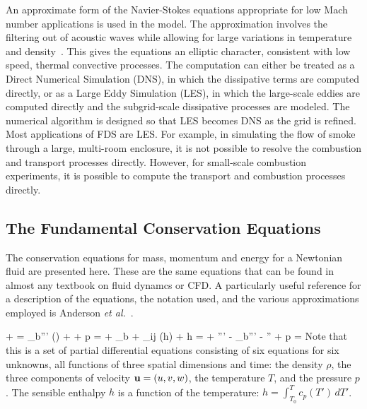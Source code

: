 \documentclass[11pt]{book}
\begin{document}
An approximate form of the Navier-Stokes equations appropriate for
low Mach number applications is used in the model.
The approximation involves the filtering out of acoustic waves while
allowing for large variations in temperature and density~\cite{Rehm:1}.
This gives the equations an elliptic character, consistent with low speed,
thermal convective processes. The computation can either be treated as a
Direct Numerical Simulation (DNS), in which the dissipative terms are computed directly,
or as a Large Eddy Simulation (LES), in which the large-scale eddies are computed
directly and the subgrid-scale dissipative processes are modeled. The numerical algorithm is
designed so that LES becomes DNS as the grid is refined.
Most applications of FDS are LES. For example, in simulating the flow of smoke through a large, multi-room enclosure, it
is not possible to resolve the combustion and transport processes directly.
However, for small-scale combustion experiments,
it is possible to compute the transport and combustion processes directly.

\subsection{The Fundamental Conservation Equations}

\label{basicequations}

The conservation equations for mass, momentum and energy for a
Newtonian fluid are presented here. These are the same equations that can
be found in almost any textbook on fluid dynamcs or CFD. A particularly useful
reference for a description of the equations, the notation used,
and the various approximations employed is Anderson {\em et al.}~\cite{Anderson:1}.

\vspace{\baselineskip}
\be {} + \nabla \cdot \rho \bu  =  \dm_b'''  \label{mass} \ee
{}
\be {} (\rho \bu) + \nabla \cdot \rho \bu \bu
+ \nabla p = \rho \bg + \bof_b
+ \nabla \cdot \btau_{ij}   \label{momentum} \ee
{}
\be {}(\rho h) + \nabla \cdot \rho h \bu =   + \dq''' - \dq_b'''
        - \nabla \cdot \dbq''  + \epsilon   \label{energy} \ee
{}
\be p =   \label{basicstate} \ee
Note that this is a set of partial differential equations consisting of
six equations for six unknowns, all functions of three spatial dimensions and time:
the density $\rho$, the three components
of velocity ${\bf u}=(u,v,w)$, the temperature $T$, and the pressure $p$.
The sensible enthalpy $h$ is a function of the temperature: $h=\int_{T_0}^T c_p(T') \, dT'$.
\end{document}
